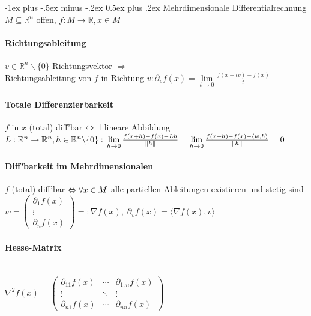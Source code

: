 \documentclass[paper=a3,paper=landscape, fontsize=9pt, DIV=30]{scrartcl}
\makeatletter
\newcommand{\real}{{\mathbb{R}}}
\renewcommand{\section}{\@startsection{section}{1}{0mm}%
  {-1ex plus -.5ex minus -.2ex}%
  {0.5ex plus .2ex}%
  {\color{blue}\normalfont\large\bfseries}}
\makeatother
\begin{document}
\begin{multicols*}{4}
  \section{Mehrdimensionale Differentialrechnung}
	$M \subseteq \real^n$ offen, $f: M \rightarrow \real, x \in M$
	\paragraph{Richtungsableitung}
	$ v \in \real^n \backslash \{0\}$ Richtungsvektor $\Rightarrow$\\Richtungsableitung von $f$ in Richtung $v: \partial_vf(x)= \lim\limits_{t \rightarrow 0} \frac{f(x+tv)-f(x)}{t}$

  \paragraph{Totale Differenzierbarkeit}
$f$ in $x$ (total) diff'bar $\Leftrightarrow\\
\exists$ lineare Abbildung $L: \real^n \rightarrow \real^n, h \in \real^n \backslash \{0\}:\\
\lim\limits_{h \rightarrow 0} \frac{f(x+h)-f(x)-Lh}{\lVert h \rVert} = \lim\limits_{h \rightarrow 0} \frac{f(x+h)-f(x)-\langle w,h \rangle}{\lVert h \rVert} = 0$

 \paragraph{Diff'barkeit im Mehrdimensionalen}
 $f$ (total) diff'bar $\Leftrightarrow\\\forall x \in M$ alle partiellen Ableitungen existieren und stetig sind\\
 $w=\begin{pmatrix}
 \partial_1f(x)\\\vdots \\ \partial_nf(x)
 \end{pmatrix} =: \nabla f(x),\; \partial_vf(x)=\langle \nabla f(x), v \rangle$

 \paragraph{Hesse-Matrix}\hspace{0pt}\\
  $ \nabla^2f(x) = \begin{pmatrix}
  \partial_{11}f(x)  & \cdots & \partial_{1,n}f(x) \\
  \vdots  & \ddots & \vdots  \\
  \partial_{n1}f(x) & \cdots & \partial_{nn}f(x)
 \end{pmatrix}$


\end{multicols*}
\end{document}
